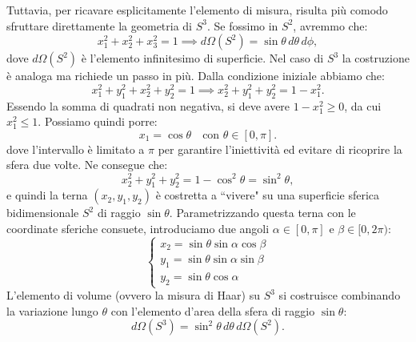 \begin{example}
\begin{enumerate}[label=\protect\circled{\arabic*}]
            Tuttavia, per ricavare esplicitamente l'elemento di misura, risulta più comodo sfruttare direttamente la geometria di $S^3$. Se fossimo in $S^2$, avremmo che:
            \begin{equation}
                x_1^2 + x_2^2 + x_3^2 = 1 \implies d\Omega(S^2) = \sin{\theta} \, d\theta \, d\phi,
            \end{equation}
            dove $d\Omega(S^2)$ è l'elemento infinitesimo di superficie. Nel caso di $S^3$ la costruzione è analoga ma richiede un passo in più. Dalla condizione iniziale abbiamo che:
            \begin{equation}
                x_1^2 + y_1^2 + x_2^2 + y_2^2 = 1 \implies x_2^2 + y_1^2 + y_2^2 = 1 - x_1^2.
            \end{equation}
            Essendo la somma di quadrati non negativa, si deve avere $1 - x_1^2 \geq 0$, da cui $x_1^2 \leq 1$. Possiamo quindi porre:
            \begin{equation}
                x_1 = \cos{\theta} \quad \text{con } \theta \in [0, \pi].
            \end{equation}
            dove l'intervallo è limitato a $\pi$ per garantire l'iniettività ed evitare di ricoprire la sfera due volte. Ne consegue che:
            \begin{equation}
                x_2^2 + y_1^2 + y_2^2 = 1 - \cos^2{\theta} = \sin^2{\theta},
            \end{equation}
            e quindi la terna $(x_2, y_1, y_2)$ è costretta a ``vivere" su una superficie sferica bidimensionale $S^2$ di raggio $\sin{\theta}$. Parametrizzando questa terna con le coordinate sferiche consuete, introduciamo due angoli $\alpha \in [0, \pi]$ e $\beta \in [0, 2\pi)$:
            \begin{equation}
                \begin{cases}
                    x_2 = \sin{\theta} \sin{\alpha} \cos{\beta} \\
                    y_1 = \sin{\theta} \sin{\alpha} \sin{\beta} \\
                    y_2 = \sin{\theta} \cos{\alpha}
                \end{cases}
            \end{equation}
            L'elemento di volume (ovvero la misura di Haar) su $S^3$ si costruisce combinando la variazione lungo $\theta$ con l'elemento d'area della sfera di raggio $\sin{\theta}$:
            \begin{equation}
                d\Omega(S^3) = \sin^2{\theta} \, d\theta \, d\Omega(S^2).

\end{equation}
\end{enumerate}
\end{example}
